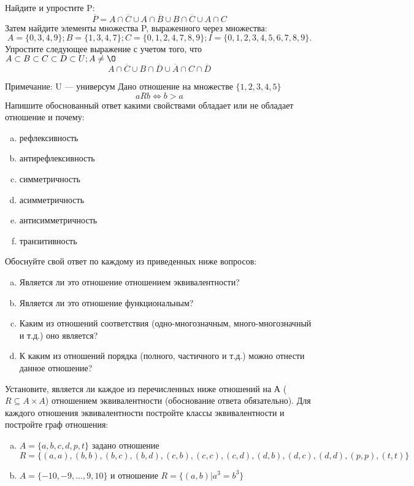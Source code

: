 \documentclass[10pt]{exam}
\begin{document}
\begin{questions}
\question
Найдите и упростите P:
\begin{equation*}
\overline{P} = A \cap \overline{C} \cup A \cap \overline{B} \cup B \cap \overline{C} \cup A \cap C
\end{equation*}
Затем найдите элементы множества P, выраженного через множества:
\begin{equation*}
A = \{0, 3, 4, 9\}; 
B = \{1, 3, 4, 7\};
C = \{0, 1, 2, 4, 7, 8, 9\};
I = \{0, 1, 2, 3, 4, 5, 6, 7, 8, 9\}.
\end{equation*}\question
Упростите следующее выражение с учетом того, что $A\subset B \subset C \subset D \subset U; A \neq \O$
\begin{equation*}
A \cap  \overline{C} \cup B \cap \overline{D} \cup  \overline{A} \cap C \cap  \overline{D}
\end{equation*}

Примечание: U — универсум\question
Дано отношение на множестве $\{1, 2, 3, 4, 5\}$ 
\begin{equation*}
aRb \iff b > a
\end{equation*}
Напишите обоснованный ответ какими свойствами обладает или не обладает отношение и почему:   
\begin{enumerate} [a)]\setcounter{enumi}{0}
\item рефлексивность
\item антирефлексивность
\item симметричность
\item асимметричность
\item антисимметричность
\item транзитивность
\end{enumerate}

Обоснуйте свой ответ по каждому из приведенных ниже вопросов:
\begin{enumerate} [a)]\setcounter{enumi}{0}
    \item Является ли это отношение отношением эквивалентности?
    \item Является ли это отношение функциональным?
    \item Каким из отношений соответствия (одно-многозначным, много-многозначный и т.д.) оно является?
    \item К каким из отношений порядка (полного, частичного и т.д.) можно отнести данное отношение?
\end{enumerate}

\question
Установите, является ли каждое из перечисленных ниже отношений на А ($R \subseteq A \times A$) отношением эквивалентности (обоснование ответа обязательно). Для каждого отношения эквивалентности постройте классы 
эквивалентности и постройте граф отношения:
\begin{enumerate} [a)]\setcounter{enumi}{0}
\item $A = \{a, b, c, d, p, t\}$ задано отношение $R = \{(a, a), (b, b), (b, c), (b, d), (c, b), (c, c), (c, d), (d, b), (d, c), (d, d), (p,p), (t,t)\}$
\item $A = \{-10, -9, … , 9, 10\}$ и отношение $R = \{(a,b)|a^{3} = b^{3}\}$


\end{enumerate}
\end{questions}
\end{document}
